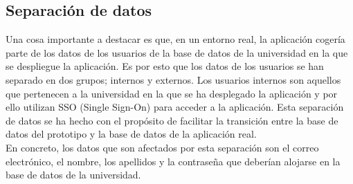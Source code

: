 \documentclass[11pt]{book}
\begin{document}
\subsection{Separación de datos}
Una cosa importante a destacar es que, en un entorno real, la aplicación cogería parte de los datos de los usuarios de la base de datos de la universidad en la que se despliegue la aplicación. Es por esto que los datos de los usuarios se han separado en dos grupos; internos y externos. Los usuarios internos son aquellos que pertenecen a la universidad en la que se ha desplegado la aplicación y por ello utilizan SSO (Single Sign-On) para acceder a la aplicación. Esta separación de datos se ha hecho con el propósito de facilitar la transición entre la base de datos del prototipo y la base de datos de la aplicación real.\\
En concreto, los datos que son afectados por esta separación son el correo electrónico, el nombre, los apellidos y la contraseña que deberían alojarse en la base de datos de la universidad.
\end{document}
